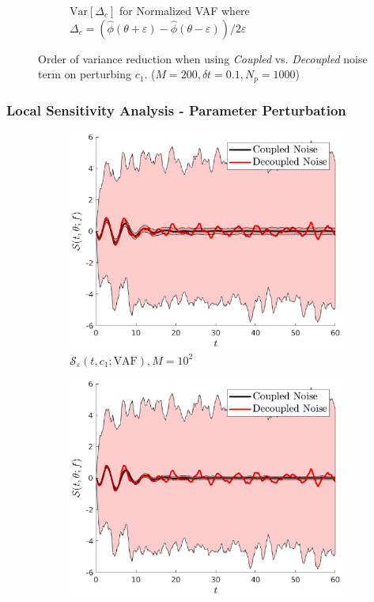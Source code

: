 \documentclass[a4paper,10pt]{beamer}
\newcommand{\sqb}[1]{\left[ #1 \right]}
\newcommand{\rb}[1]{\left( #1 \right)}
\begin{document}
\begin{frame}
\begin{figure}[H]
\begin{subfigure}[b]{0.48\linewidth}
				\caption{\scriptsize $\text{Var}\sqb{\Delta_{c}}$ for Normalized VAF where $\Delta_{c} = \rb{\hat{\phi}\rb{\theta+\varepsilon} - \hat{\phi}\rb{\theta-\varepsilon}}/2\varepsilon$}
			\end{subfigure}
		\caption{Order of variance reduction when using \textit{Coupled} vs. \textit{Decoupled} noise term on perturbing $c_{1}$. ($M=200,\delta t = 0.1,N_{p} = 1000$) }
		\end{figure}
	\end{frame}

	\begin{frame}
		\frametitle{Local Sensitivity Analysis - Parameter Perturbation}
		\begin{figure}[H]
			\centering
			\begin{subfigure}{0.32\linewidth}
				\includegraphics[width=\linewidth]{./Plots/sensitivityAnalysis/c1M100.eps}
				\caption{\tiny $\mathcal{S}_{\varepsilon} \rb{t,c_{1};\text{VAF}}, M = 10^{2}$}
			\end{subfigure}
			\begin{subfigure}{0.32\linewidth}
				\includegraphics[width=\linewidth]{./Plots/sensitivityAnalysis/c3M100.eps}

\end{subfigure}
\end{figure}
\end{frame}
\end{document}
